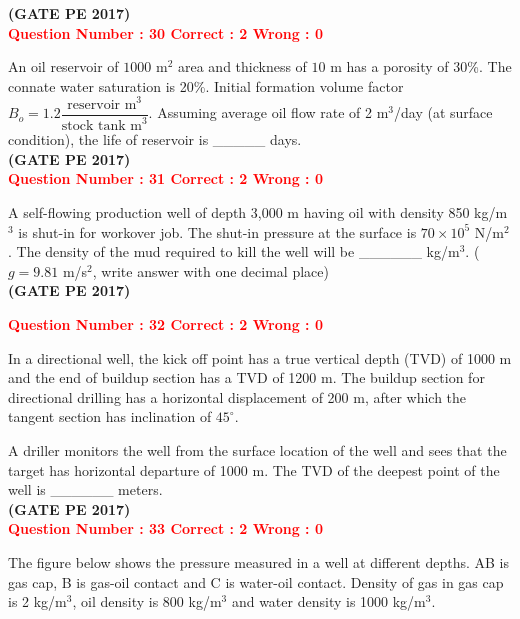 \documentclass[12pt]{article}
\begin{document}
{\hfill\textbf{(GATE PE 2017)}\\[0.6cm]


\textcolor{red}{\textbf{Question Number : 30 \hfill Correct : 2  Wrong : 0}}

An oil reservoir of $1000$ m$^2$ area and thickness of $10$ m has a porosity of 30\%. The connate water saturation is 20\%. Initial formation volume factor $B_o = 1.2 \dfrac{\text{reservoir m}^3}{\text{stock tank m}^3}$. Assuming average oil flow rate of 2 m$^3$/day (at surface condition), the life of reservoir is \_\_\_\_\_ days.\\

\hfill\textbf{(GATE PE 2017)}\\[0.6cm]

\textcolor{red}{\textbf{Question Number : 31 \hfill Correct : 2  Wrong : 0}}

A self-flowing production well of depth 3,000 m having oil with density 850 kg/m$^3$ is shut-in for workover job. The shut-in pressure at the surface is $70 \times 10^5$ N/m$^2$. The density of the mud required to kill the well will be \_\_\_\_\_\_ kg/m$^3$. ($g = 9.81$ m/s$^2$, write answer with one decimal place)\\

\hfill\textbf{(GATE PE 2017)}\\[0.6cm]

\newpage

\textcolor{red}{\textbf{Question Number : 32 \hfill Correct : 2  Wrong : 0}}

In a directional well, the kick off point has a true vertical depth (TVD) of 1000 m and the end of buildup section has a TVD of 1200 m. The buildup section for directional drilling has a horizontal displacement of 200 m, after which the tangent section has inclination of $45^\circ$.

A driller monitors the well from the surface location of the well and sees that the target has horizontal departure of 1000 m. The TVD of the deepest point of the well is \_\_\_\_\_\_ meters.\\

\hfill\textbf{(GATE PE 2017)}\\[0.6cm]

\textcolor{red}{\textbf{Question Number : 33 \hfill Correct : 2  Wrong : 0}}

The figure below shows the pressure measured in a well at different depths. AB is gas cap, B is gas-oil contact and C is water-oil contact. Density of gas in gas cap is 2 kg/m$^3$, oil density is 800 kg/m$^3$ and water density is 1000 kg/m$^3$.

}
\end{document}
